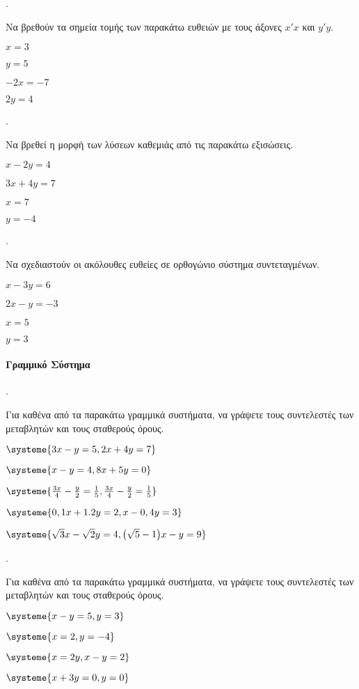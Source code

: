 \documentclass[11pt,a4paper,twocolumn]{article}
\newcounter{askhsh}
\newcommand{\askhsh}{\large\theaskhsh.\ \addtocounter{askhsh}{1}}
\begin{document}
\askhsh Να βρεθούν τα σημεία τομής των παρακάτω ευθειών με τους άξονες $ x'x $ και $ y'y $.
\begin{multicols}{2}
\begin{alist}
\item $ x=3 $
\item $ y=5 $
\item $ -2x=-7 $
\item $ 2y=4 $
\end{alist}
\end{multicols}
\askhsh Να βρεθεί η μορφή των λύσεων καθεμιάς από τις παρακάτω εξισώσεις.
\begin{multicols}{2}
\begin{alist}
\item $ x-2y=4 $
\item $ 3x+4y=7 $
\item $ x=7 $
\item $ y=-4 $
\end{alist}
\end{multicols}
\askhsh Να σχεδιαστούν οι ακόλουθες ευθείες σε ορθογώνιο σύστημα συντεταγμένων.
\begin{multicols}{2}
\begin{alist}
\item $ x-3y=6 $
\item $ 2x-y=-3 $
\item $ x=5 $
\item $ y=3 $
\end{alist}
\end{multicols}
\paragraph{Γραμμικό Σύστημα}
\askhsh Για καθένα από τα παρακάτω γραμμικά συστήματα, να γράψετε τους συντελεστές των μεταβλητών και τους σταθερούς όρους.
\begin{alist}
\begin{multicols}{2}
\item $ \systeme{3x-y=5,2x+4y=7} $
\item $ \systeme{x-y=4,8x+5y=0} $
\item $ \systeme{\frac{3x}{4}-\frac{y}{2}=\frac{1}{5},\frac{3x}{4}-\frac{y}{2}=\frac{1}{5}} $
\item $ \systeme{{0,1}x+{1.2}y=2,x-{0,4}y=3} $
\end{multicols}
\item $ \systeme{\sqrt{3}x-\sqrt{2}y=4,{\left(\sqrt{5}-1\right)}x-y=9} $
\end{alist}
\askhsh Για καθένα από τα παρακάτω γραμμικά συστήματα, να γράψετε τους συντελεστές των μεταβλητών και τους σταθερούς όρους.
\begin{multicols}{2}
\begin{alist}
\item $ \systeme{x-y=5,y=3} $
\item $ \systeme{x=2,y=-4} $
\item $ \systeme{x=2y,x-y=2} $
\item $ \systeme{x+3y=0,y=0} $
\end{alist}
\end{multicols}
\end{document}
